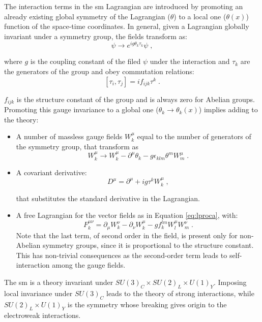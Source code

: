 The interaction terms in the \gls{sm} Lagrangian are introduced by promoting an already existing global symmetry of the Lagrangian ($\theta$) to a local one ($\theta(x)$) function of the space-time coordinates. 
In general, given a Lagrangian globally invariant under a symmetry group, the fields transform as:
\begin{equation}
\psi \rightarrow e^{ig\theta_k \tau_k} \psi  \; ,
\end{equation}

\noindent where $g$ is the coupling constant of the filed $\psi$ under the interaction and $\tau_k$ are the generators of the group and obey commutation relations: 
\begin{equation}
\left[ \tau_i, \tau_j \right] = i f_{ijk} \tau^k \; . 
\end{equation}

\noindent $f_{ijk}$ is the structure constant of the group and is always zero for Abelian groups. Promoting this gauge invariance to a global one ($\theta_k \rightarrow \theta_k(x)$) implies adding to the theory:
\begin{itemize}
\item A number of massless gauge fields $W^\mu_k$ equal to the number of generators of the symmetry group, that transform as 
\begin{equation}
W^\mu_k \rightarrow W^\mu_k - \partial^\mu \theta_k - g \epsilon_{klm} \theta^m W^\mu_m \; .
\end{equation}
\item A covariant derivative: 
\begin{equation}
D^\mu = \partial^\mu + ig\tau^kW^\mu_k \; ,
\end{equation}

\noindent that substitutes the standard derivative in the Lagrangian.
\item A free Lagrangian for the vector fields as in Equation \ref{eq:lproca}, with:
\begin{equation}
F^{\mu \nu}_k = \partial_\mu W_k^\nu - \partial_\nu W_k^\mu - g f_k^{lm} W^\mu_l W^\nu_m \; .
\end{equation}
\noindent Note that the last term, of second order in the field, is present only for non-Abelian symmetry groups, since it is proportional to the structure constant. This has non-trivial consequences as the second-order term leads to self-interaction among the gauge fields.
\end{itemize}


The \gls{sm} is a theory invariant under $SU(3)_{C} \times SU(2)_{L} \times U(1)_{Y}$. Imposing local invariance under $SU(3)_{C}$ leads to the theory of strong interactions, while $SU(2)_{L} \times U(1)_{Y}$ is the symmetry whose breaking gives origin to the electroweak interactions. 

